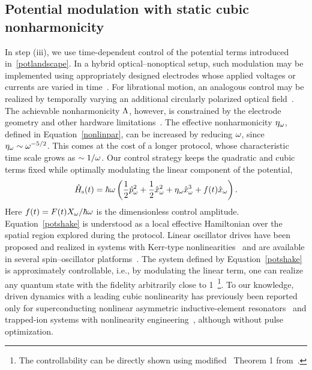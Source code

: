 \documentclass[reprint,prx,footinbib,floatfix,twocolumn,longbibliography,superscriptaddress]{revtex4-2}
\begin{document}
\subsection{Potential modulation with static cubic nonharmonicity}
In step (iii), we use time-dependent control of the potential terms introduced in~\eqref{potlandscape}.
In a hybrid optical–nonoptical setup, such modulation may be implemented using appropriately designed electrodes whose applied voltages or currents are varied in time~\cite{Wilson2015,Foot2018,Magrini2021,Tebbenjohanns2020,Tebbenjohanns2021}.
For librational motion, an analogous control may be realized by temporally varying an additional circularly polarized optical field~\cite{Zielinska2023}.
The achievable nonharmonicity $\Lambda$, however, is constrained by the electrode geometry and other hardware limitations~\cite{Home2011,Rosiek2024}.
The effective nonharmonicity $\eta_{\omega}$, defined in Equation~\eqref{nonlinpar}, can be increased by reducing $\omega$, since $\eta_{\omega} \sim \omega^{-5/2}$.
This comes at the cost of a longer protocol, whose characteristic time scale grows as $\sim 1/\omega$.
Our control strategy keeps the quadratic and cubic terms fixed while optimally modulating the linear component of the potential,
\begin{align}
    \hat{H}_{\text{s}} (t) = \hbar \omega \left( \frac{1}{2} \hat{p}_{\omega}^2 + \frac{1}{2} \hat{x}_{\omega}^2 +  \eta_{\omega} \hat{x}_{\omega}^3 + f(t)\hat{x}_{\omega}   \right).
    \label{potshake}
\end{align}
Here $f(t) = F(t) X_{\omega} / \hbar \omega$ is the dimensionless control amplitude.
Equation~\eqref{potshake} is understood as a local effective Hamiltonian over the spatial region explored during the protocol.
Linear oscillator drives have been proposed and realized in systems with Kerr-type nonlinearities~\cite{Kamal2009,Yuan2025,Zhao2023} and are available in several spin–oscillator platforms~\cite{Heeres2017,Eickbusch2022,Matsos2024,Matsos2025}.
The system defined by Equation~\eqref{potshake} is approximately controllable, i.e., by modulating the linear term, one can realize any quantum state with the fidelity arbitrarily close to 1~\footnote{The controllability can be directly shown using modified~\cite{Zhao2023} Theorem 1 from~\cite{Merkel2009}.}.
To our knowledge, driven dynamics with a leading cubic nonlinearity has previously been reported only for superconducting nonlinear asymmetric inductive-element resonators~\cite{Eriksson2024} and trapped-ion systems with nonlinearity engineering~\cite{Bazavan2026}, although without pulse optimization.
\end{document}
